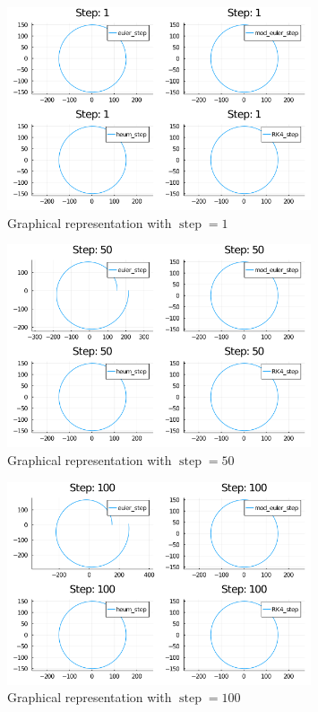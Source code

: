 \documentclass[12pt, onside]{article}
\begin{document}
\begin{figure}[p]
    \centering
    \includegraphics[width=0.8\textwidth]{media/two_bodies_step_1.png}
    \caption{Graphical representation with $\operatorname{step} = 1$}
    \label{fig:step1}
\end{figure}

\begin{figure}[p]
    \centering
    \includegraphics[width=0.8\textwidth]{media/two_bodies_step_50.png}
    \caption{Graphical representation with $\operatorname{step} = 50$}
    \label{fig:step50}
\end{figure}

\begin{figure}[p]
    \centering
    \includegraphics[width=0.8\textwidth]{media/two_bodies_step_100.png}
    \caption{Graphical representation with $\operatorname{step} = 100$}
    \label{fig:step100}
\end{figure}
\end{document}
